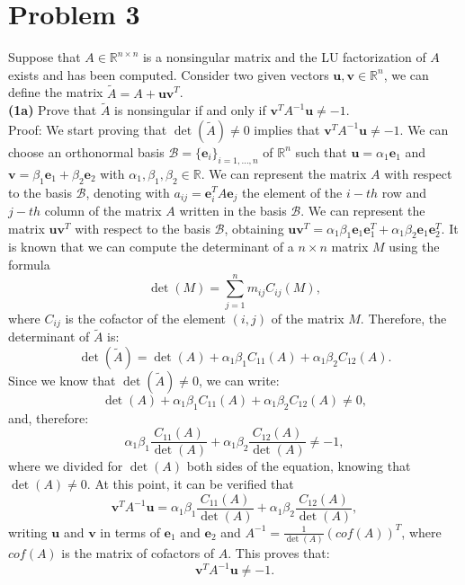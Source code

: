 \documentclass[a4paper,11pt]{article}
\newcommand{\R}{\mathbb{R}}
\begin{document}
\section{Problem 3}
Suppose that $A \in \R^{n \times n}$ is a nonsingular matrix and the LU factorization of $A$ exists and has been computed. Consider two given vectors $\textbf{u},\textbf{v}\in \R^n$, we can define the matrix $\tilde{A} = A + \textbf{u}\textbf{v}^T$.\\

\noindent \textbf{(1a)} Prove that $\tilde{A}$ is nonsingular if and only if $\textbf{v}^TA^{-1}\textbf{u} \neq - 1$.\\

\noindent Proof: We start proving that $\det(\tilde{A})\neq 0 $ implies that $\textbf{v}^TA^{-1}\textbf{u} \neq - 1$. We can choose an orthonormal basis $\mathcal{B} =\{\mathbf{e}_i\}_{i=1,\dots,n}$ of $\R^n$ such that $\mathbf{u} = \alpha_1 \mathbf{e}_1$ and $\mathbf{v} = \beta_1 \mathbf{e}_1 + \beta_2 \mathbf{e}_2$ with $\alpha_1, \beta_1, \beta_2 \in \R$. We can represent the matrix $A$ with respect to the basis $\mathcal{B}$, denoting with $a_{ij} = \textbf{e}^T_i A \textbf{e}_j $  the element of the $i-th$ row and $j-th$ column of the matrix $A$ written in the basis $\mathcal{B}$. We can represent the matrix $ \textbf{u}\textbf{v}^T$ with respect to the basis $\mathcal{B}$, obtaining $\textbf{u}\textbf{v}^T = \alpha_1 \beta_1 \textbf{e}_1 \textbf{e}_1^T +  \alpha_1 \beta_2 \textbf{e}_1 \textbf{e}_2^T$. It is known that we can compute the determinant of a $n\times n$ matrix $M$ using the formula
\begin{equation}\label{key}
	\det(M) = \sum_{j=1}^{n} m_{ij} C_{ij}(M),
\end{equation}
where $C_{ij}$ is the cofactor of the element $(i,j)$ of the matrix $M$. Therefore, the determinant of $\tilde{A}$ is:
\begin{equation}\label{key}
	\det(\tilde{A}) = \det(A) + \alpha_1 \beta_1 C_{11}(A) + \alpha_1 \beta_2 C_{12}(A).
\end{equation}
Since we know that $ \det(\tilde{A}) \neq 0$, we can write:
\begin{equation}\label{key}
	\det(A) + \alpha_1 \beta_1 C_{11}(A) + \alpha_1 \beta_2 C_{12}(A) \neq 0,
\end{equation}
and, therefore:
\begin{equation}\label{key}
	\alpha_1 \beta_1 \frac{C_{11}(A)}{\det(A)} + \alpha_1 \beta_2 \frac{C_{12}(A)}{\det(A)} \neq -1,
\end{equation}
where we divided for $\det(A)$ both sides of the equation, knowing that $\det(A) \neq 0$. At this point, it can be verified that 
\begin{equation}\label{key}
	\textbf{v}^T A^{-1} \textbf{u} = \alpha_1 \beta_1 \frac{C_{11}(A)}{\det(A)} + \alpha_1 \beta_2 \frac{C_{12}(A)}{\det(A)},
\end{equation}
writing $\textbf{u}$ and $\textbf{v}$ in terms of $\textbf{e}_1$ and $\textbf{e}_2$ and $A^{-1} = \frac{1}{\det(A)} (cof(A))^T$, where $cof(A)$ is the matrix of cofactors of $A$. This proves that:
\begin{equation}\label{key}
	\textbf{v}^T A^{-1} \textbf{u} \neq -1.
\end{equation}
\end{document}
